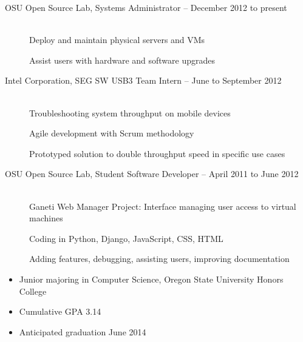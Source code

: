 \documentclass[11pt]{article}
\begin{document}
\begin{description}
\item[OSU Open Source Lab, Systems Administrator -- December 2012 to present]
    \hfill \\
    Deploy and maintain physical servers and VMs

    Assist users with hardware and software upgrades

\item[Intel Corporation, SEG SW USB3 Team Intern -- June to September
2012]
    \hfill \\
    Troubleshooting system throughput on mobile devices

    Agile development with Scrum methodology

    Prototyped solution to double throughput speed in specific use cases

\item[OSU Open Source Lab, Student Software Developer -- April 2011 to June
2012]
    \hfill \\
    Ganeti Web Manager Project: Interface managing user access to
    virtual machines

    Coding in Python, Django, JavaScript, CSS, HTML

    Adding features, debugging, assisting users, improving documentation

\end{description}

\hrulefill
\smallskip

\begin{itemize}

    \item Junior majoring in Computer Science, Oregon State University 
          Honors College

    \item Cumulative GPA 3.14

    \item Anticipated graduation June 2014

\end{itemize}
\end{document}
